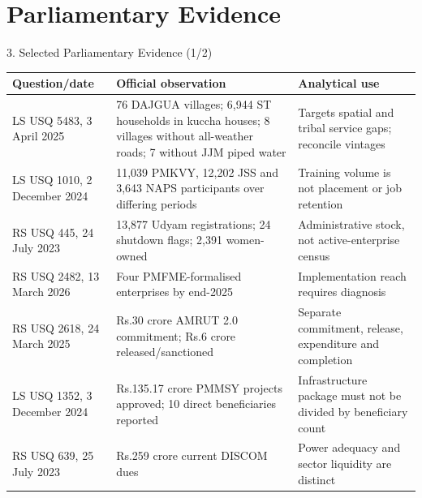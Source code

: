 \documentclass[aspectratio=169,11pt]{beamer}
\renewcommand{\arraystretch}{1.12}
\begin{document}
\section{Parliamentary Evidence}
\begin{frame}{3. Selected Parliamentary Evidence (1/2)}\tiny\setlength{\tabcolsep}{2pt}\renewcommand{\arraystretch}{1.1}
\begin{tabularx}{\textwidth}{p{}p{}Y}\toprule
Question/date & Official observation & Analytical use\\\midrule
LS USQ 5483, 3 April 2025 & 76 DAJGUA villages; 6,944 ST households in kuccha houses; 8 villages without all-weather roads; 7 without JJM piped water & Targets spatial and tribal service gaps; reconcile vintages\\
LS USQ 1010, 2 December 2024 & 11,039 PMKVY, 12,202 JSS and 3,643 NAPS participants over differing periods & Training volume is not placement or job retention\\
RS USQ 445, 24 July 2023 & 13,877 Udyam registrations; 24 shutdown flags; 2,391 women-owned & Administrative stock, not active-enterprise census\\
RS USQ 2482, 13 March 2026 & Four PMFME-formalised enterprises by end-2025 & Implementation reach requires diagnosis\\
RS USQ 2618, 24 March 2025 & Rs.30 crore AMRUT 2.0 commitment; Rs.6 crore released/sanctioned & Separate commitment, release, expenditure and completion\\
LS USQ 1352, 3 December 2024 & Rs.135.17 crore PMMSY projects approved; 10 direct beneficiaries reported & Infrastructure package must not be divided by beneficiary count\\
RS USQ 639, 25 July 2023 & Rs.259 crore current DISCOM dues & Power adequacy and sector liquidity are distinct\\
\bottomrule\end{tabularx}
\end{frame}
\end{document}
